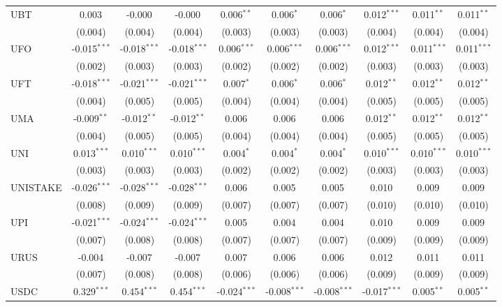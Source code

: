 \begin{table}[!htbp]
\begin{tabular}{@{\extracolsep{5pt}}lccccccccc}
 UBT & 0.003$^{}$ & -0.000$^{}$ & -0.000$^{}$ & 0.006$^{**}$ & 0.006$^{*}$ & 0.006$^{*}$ & 0.012$^{***}$ & 0.011$^{**}$ & 0.011$^{**}$ \\
  & (0.004) & (0.004) & (0.004) & (0.003) & (0.003) & (0.003) & (0.004) & (0.004) & (0.004) \\
 UFO & -0.015$^{***}$ & -0.018$^{***}$ & -0.018$^{***}$ & 0.006$^{***}$ & 0.006$^{***}$ & 0.006$^{***}$ & 0.012$^{***}$ & 0.011$^{***}$ & 0.011$^{***}$ \\
  & (0.002) & (0.003) & (0.003) & (0.002) & (0.002) & (0.002) & (0.003) & (0.003) & (0.003) \\
 UFT & -0.018$^{***}$ & -0.021$^{***}$ & -0.021$^{***}$ & 0.007$^{*}$ & 0.006$^{*}$ & 0.006$^{*}$ & 0.012$^{**}$ & 0.012$^{**}$ & 0.012$^{**}$ \\
  & (0.004) & (0.005) & (0.005) & (0.004) & (0.004) & (0.004) & (0.005) & (0.005) & (0.005) \\
 UMA & -0.009$^{**}$ & -0.012$^{**}$ & -0.012$^{**}$ & 0.006$^{}$ & 0.006$^{}$ & 0.006$^{}$ & 0.012$^{**}$ & 0.012$^{**}$ & 0.012$^{**}$ \\
  & (0.004) & (0.005) & (0.005) & (0.004) & (0.004) & (0.004) & (0.005) & (0.005) & (0.005) \\
 UNI & 0.013$^{***}$ & 0.010$^{***}$ & 0.010$^{***}$ & 0.004$^{*}$ & 0.004$^{*}$ & 0.004$^{*}$ & 0.010$^{***}$ & 0.010$^{***}$ & 0.010$^{***}$ \\
  & (0.003) & (0.003) & (0.003) & (0.002) & (0.002) & (0.002) & (0.003) & (0.003) & (0.003) \\
 UNISTAKE & -0.026$^{***}$ & -0.028$^{***}$ & -0.028$^{***}$ & 0.006$^{}$ & 0.005$^{}$ & 0.005$^{}$ & 0.010$^{}$ & 0.009$^{}$ & 0.009$^{}$ \\
  & (0.008) & (0.009) & (0.009) & (0.007) & (0.007) & (0.007) & (0.010) & (0.010) & (0.010) \\
 UPI & -0.021$^{***}$ & -0.024$^{***}$ & -0.024$^{***}$ & 0.005$^{}$ & 0.004$^{}$ & 0.004$^{}$ & 0.010$^{}$ & 0.009$^{}$ & 0.009$^{}$ \\
  & (0.007) & (0.008) & (0.008) & (0.007) & (0.007) & (0.007) & (0.009) & (0.009) & (0.009) \\
 URUS & -0.004$^{}$ & -0.007$^{}$ & -0.007$^{}$ & 0.007$^{}$ & 0.006$^{}$ & 0.006$^{}$ & 0.012$^{}$ & 0.011$^{}$ & 0.011$^{}$ \\
  & (0.007) & (0.008) & (0.008) & (0.006) & (0.006) & (0.006) & (0.009) & (0.009) & (0.009) \\
 USDC & 0.329$^{***}$ & 0.454$^{***}$ & 0.454$^{***}$ & -0.024$^{***}$ & -0.008$^{***}$ & -0.008$^{***}$ & -0.017$^{***}$ & 0.005$^{**}$ & 0.005$^{**}$ \\

\end{tabular}
\end{table}
